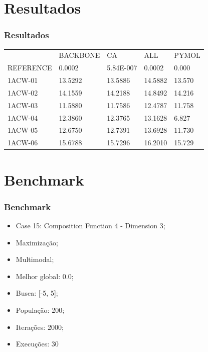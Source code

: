 \documentclass{beamer}
\begin{document}
\section{Resultados}

\begin{frame}
\frametitle{Resultados}
\begin{table}[]
\centering
\label{my-label}
\begin{tabular}{lllll}
          & BACKBONE          & CA            & ALL    & PYMOL           \\
REFERENCE & 0.0002 & 5.84E-007     & 0.0002 & 0.000 \\
1ACW-01   & 13.5292     & 13.5886 & 14.5882 & 13.570   \\
1ACW-02   & 14.1559     & 14.2188 & 14.8492 & 14.216    \\
1ACW-03   & 11.5880     & 11.7586 & 12.4787 & 11.758   \\
1ACW-04   & 12.3860     & 12.3765 & 13.1628 & 6.827  \\
1ACW-05   & 12.6750     & 12.7391 & 13.6928 & 11.730   \\
1ACW-06   & 15.6788     & 15.7296 & 16.2010 & 15.729                   
\end{tabular}
\end{table}
\end{frame}

\section{Benchmark}

\begin{frame}
\frametitle{Benchmark}
\begin{itemize}
\item Case 15: Composition Function 4 - Dimension 3;
\item Maximização;
\item Multimodal;
\item Melhor global: 0.0;
\item Busca: [-5, 5];
\item População: 200;
\item Iterações: 2000;
\item Execuções: 30
\end{itemize}
\end{frame}
\end{document}

